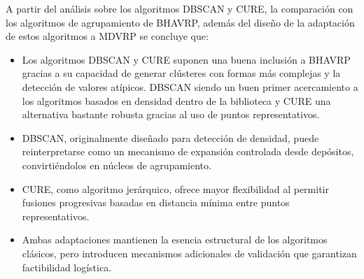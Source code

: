 A partir del an\'alisis sobre los algoritmos DBSCAN y CURE, la comparaci\'on con los algoritmos de agrupamiento de BHAVRP, adem\'as del dise\~no de la adaptaci\'on de estos algoritmos a MDVRP se concluye que:

\begin{itemize}
  \item Los algoritmos DBSCAN y CURE suponen una buena inclusi\'on a BHAVRP gracias a su capacidad de generar cl\'usteres con formas m\'as complejas y la detecci\'on de valores at\'ipicos. DBSCAN siendo un buen primer acercamiento a los algoritmos basados en densidad dentro de la biblioteca y CURE una alternativa bastante robusta gracias al uso de puntos representativos.
  \item DBSCAN, originalmente dise\~nado para detecci\'on de densidad, puede reinterpretarse como un mecanismo de expansi\'on controlada desde dep\'ositos, convirti\'endolos en n\'ucleos de agrupamiento.
  \item CURE, como algoritmo jer\'arquico, ofrece mayor flexibilidad al permitir fusiones progresivas basadas en distancia m\'inima entre puntos representativos.
  \item Ambas adaptaciones mantienen la esencia estructural de los algoritmos cl\'asicos, pero introducen mecanismos adicionales de validaci\'on que garantizan factibilidad log\'istica.
\end{itemize}